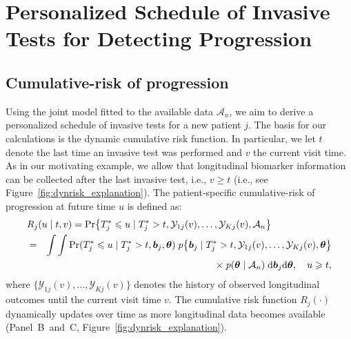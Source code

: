 \section{Personalized Schedule of Invasive Tests for Detecting Progression} 
\label{sec:schedule}

\subsection{Cumulative-risk of progression} 
\label{subsec:cum_risk}
Using the joint model fitted to the available data $\mathcal A_n$, we aim to derive a personalized schedule of invasive tests for a new patient $j$. The basis for our calculations is the dynamic cumulative risk function. In particular, we let $t$ denote the last time an invasive test was performed and $v$ the current visit time. As in our motivating example, we allow that longitudinal biomarker information can be collected after the last invasive test, i.e., $v \geq t$ (i.e., see Figure~\ref{fig:dynrisk_explanation}). The patient-specific cumulative-risk of progression at future time $u$ is defined as:
\begin{eqnarray}
\label{eq:cumulative_risk}
\nonumber \lefteqn{R_j(u \mid t, v) = \mbox{Pr}\big\{T^*_j \leq u \mid T^*_j > t, \mathcal{Y}_{1j}(v), \ldots, \mathcal{Y}_{Kj}(v), \mathcal{A}_n\big\}}\\
\nonumber & = & \int \int \mbox{Pr}(T^*_j \leq u \mid T^*_j > t, \boldsymbol{b}_{j}, \boldsymbol{\theta}) \; p\big\{\boldsymbol{b}_j \mid T^*_j > t, \mathcal{Y}_{1j}(v), \ldots, \mathcal{Y}_{Kj}(v), \boldsymbol{\theta} \big\}\\
& & \quad \quad \times \; p(\boldsymbol{\theta} \mid \mathcal{A}_n) \; \mathrm{d}\boldsymbol{b}_j \mathrm{d}\boldsymbol{\theta}, \quad u \geq t,
\end{eqnarray}
where $\{\mathcal{Y}_{1j}(v), \ldots, \mathcal{Y}_{Kj}(v)\}$ denotes the history of observed longitudinal outcomes until the current visit time $v$. The cumulative risk function $R_j(\cdot)$ dynamically updates over time as more longitudinal data becomes available (Panel~B~and~C, Figure~\ref{fig:dynrisk_explanation}).
